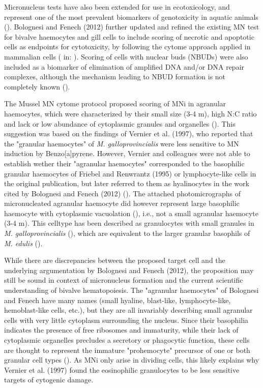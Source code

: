 Micronucleus tests have also been extended for use in ecotoxicology, and represent one of the most prevalent biomarkers of genotoxicity in aquatic animals (\cite{Bolognesi2012}). Bolognesi and Fenech (2012) further updated and refined the existing MN test for bivalve haemocytes and gill cells to include scoring of necrotic and apoptotic cells as endpoints for cytotoxicity, by following the cytome approach applied in mammalian cells (\cite{Fenech2007} in: \cite{Bolognesi2012}). Scoring of cells with nuclear buds (NBUDs) were also included as a biomarker of elimination of amplified DNA and/or DNA repair complexes, although the mechanism leading to NBUD formation is not completely known (\cite{Bolognesi2012}).

The Mussel MN cytome protocol proposed scoring of MNi in agranular haemocytes, which were characterized by their small size (3-4 \micro m), high N:C ratio and lack or low abundance of cytoplasmic granules and organelles (\cite{Bolognesi2012}). This suggestion was based on the findings of Vernier et al. (1997), who reported that the "granular haemocytes" of \emph{M. galloprovincialis} were less sensitive to MN induction by Benzo[a]pyrene. However, Vernier and colleagues were not able to establish wether their "agranular haemocytes" corresponded to the basophilic granular haemocytes of Friebel and Renwrantz (1995) or lymphocyte-like cells in the original publication, but later referred to them as hyalinocytes in the work cited by Bolognesi and Fenech (2012) (\cite{Dolcetti2002}). The attached photomicrographs of micronucleated agranular haemocyte did however represent large basophilic haemocyte with cytoplasmic vacuolation (\cite{Venier1997, Dolcetti2002}), i.e., not a small agranular haemocyte (3-4 \micro m). This celltype has been described as granulocytes with small granules in \emph{M. galloprovincialis} (\cite{Carballal1997}), which are equivalent to the larger granular basophils of \emph{M. edulis} (\cite{Moore1977}).

While there are discrepancies between the proposed target cell and the underlying argumentation by Bolognesi and Fenech (2012), the proposition may still be sound in context of micronucleus formation and the current scientific understanding of bivalve hematopoiesis. The "agranular haemocytes" of Bolognesi and Fenech have many names (small hyaline, blast-like, lymphocyte-like, hemoblast-like cells, etc.), but they are all invariably describing small agranular cells with very little cytoplasm surrounding the nucleus. Since their basophilia indicates the presence of free ribosomes and immaturity, while their lack of cytoplasmic organelles precludes a secretory or phagocytic function, these cells are thought to represent the immature "prohemocyte" precursor of one or both granular cell types (\cite{Hine1999, delaBallina2022, Smith2016}). As MNi only arise in dividing cells, this likely explains why Vernier et al. (1997) found the eosinophilic granulocytes to be less sensitive targets of cytogenic damage.

